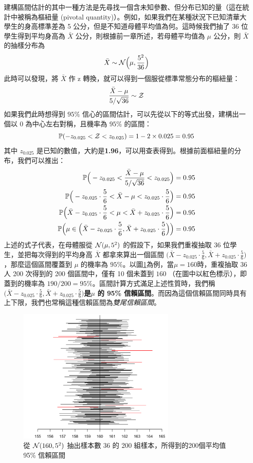     建構區間估計的其中一種方法是先尋找一個含未知參數、但分布已知的量（這在統計中被稱為樞紐量 (pivotal quantity)）。例如，如果我們在某種狀況下已知清華大學生的身高標準差為 5 公分，但是不知道母體平均值為何。這時候我們抽了 36 位學生得到平均身高為 $\bar{X}$ 公分，則根據前一章所述，若母體平均值為 $\mu$ 公分，則 $\bar{X}$ 的抽樣分布為
    \[\bar{X} \sim \mathcal{N}\Big(\mu, \frac{5^2}{36}\Big)\]
    此時可以發現，將 $\bar{X}$ 作 z 轉換，就可以得到一個服從標準常態分布的樞紐量：
    \[\frac{\bar{X} - \mu}{5/\sqrt{36}} \sim \mathcal{Z}\]
    如果我們此時想得到 $95\%$ 信心的區間估計，可以先從以下的等式出發，建構出一個以 0 為中心左右對稱，且機率為 $95\%$ 的區間：
    \[\mathbb{P}(-z_{0.025} < \mathcal{Z} < z_{0.025}) = 1-2 \times 0.025 = 0.95\]
    其中 $z_{0.025}$ 是已知的數值，大約是\textbf{1.96}，可以用查表得到。根據前面樞紐量的分布，我們可以推出：
    \begin{align*}
        \mathbb{P}\Big(-z_{0.025} < \frac{\bar{X} - \mu}{5/\sqrt{36}} < z_{0.025}\Big) &= 0.95\\
        \mathbb{P}\Big(-z_{0.025}\cdot \frac{5}{6} < \bar{X} - \mu < z_{0.025}\cdot \frac{5}{6}\Big) &= 0.95\\
        \mathbb{P}\Big(\bar{X}-z_{0.025}\cdot \frac{5}{6} < \mu < \bar{X} + z_{0.025}\cdot \frac{5}{6}\Big) &= 0.95\\
        \mathbb{P}\Big(\mu \in \Big(\bar{X}-z_{0.025}\cdot \frac{5}{6},  \bar{X} + z_{0.025}\cdot \frac{5}{6}\Big)\Big) &= 0.95
    \end{align*}
    上述的式子代表，在母體服從 $\mathcal{N}(\mu, 5^2)$ 的假設下，如果我們重複抽取 36 位學生，並把每次得到的平均身高 $\bar{X}$ 都拿來算出一個區間 $\big(\bar{X}-z_{0.025}\cdot \frac{5}{6},  \bar{X} + z_{0.025}\cdot \frac{5}{6}\big)$，那麼這個區間覆蓋到 $\mu$ 的機率為 $95\%$。以圖\ref{fig:confidence_interval}為例，當$\mu = 160$時，重複抽取 36 人 200 次得到的 200 個區間中，僅有 10 個未蓋到 $160$ （在圖中以紅色標示），即蓋到的機率為 $190/200 = 95\%$。區間計算方式滿足上述性質時，我們稱\textbf{$\big(\bar{X}-z_{0.025}\cdot \frac{5}{6},  \bar{X} + z_{0.025}\cdot \frac{5}{6}\big)$是$\mu$ 的 95\% 信賴區間}。而因為這個信賴區間同時具有上下限，我們也常稱這種信賴區間為\textit{雙尾信賴區間}。
    
    \begin{figure}[htbp]
        \centering
        \includegraphics[width=0.7\textwidth]{figures/05-Confidence_interval/Confidence_interval.png}
        \caption{從 $\mathcal{N}(160, 5^2)$ 抽出樣本數 36 的 200 組樣本，所得到的200個平均值 95\% 信賴區間}
        \label{fig:confidence_interval}
    \end{figure}
    
